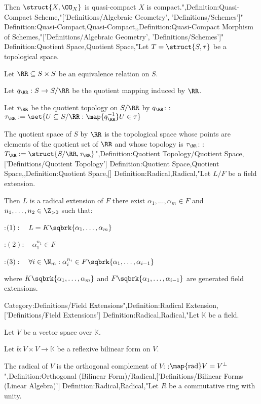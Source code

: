 Then $\struct {X, \OO_X}$ is quasi-compact  $X$ is compact.",Definition:Quasi-Compact Scheme,"['Definitions/Algebraic Geometry', 'Definitions/Schemes']"
Definition:Quasi-Compact,Quasi-Compact,,Definition:Quasi-Compact Morphism of Schemes,"['Definitions/Algebraic Geometry', 'Definitions/Schemes']"
Definition:Quotient Space,Quotient Space,"Let $T = \struct {S, \tau}$ be a topological space.

Let $\RR \subseteq S \times S$ be an equivalence relation on $S$.

Let $q_\RR: S \to S / \RR$ be the quotient mapping induced by $\RR$.


Let $\tau_\RR$ be the quotient topology on $S / \RR$ by $q_\RR$:
:$\tau_\RR := \set {U \subseteq S / \RR: \map {q_\RR^{-1} } U \in \tau}$


The quotient space of $S$ by $\RR$ is the topological space whose points are elements of the quotient set of $\RR$ and whose topology is $\tau_\RR$:
:$T_\RR := \struct {S / \RR, \tau_\RR}$",Definition:Quotient Topology/Quotient Space,['Definitions/Quotient Topology']
Definition:Quotient Space,Quotient Space,,Definition:Quotient Space,[]
Definition:Radical,Radical,"Let $L / F$ be a field extension.

Then $L$ is a radical extension of $F$  there exist $\alpha_1, \ldots, \alpha_m \in F$ and $n_1, \ldots, n_2 \in \Z_{>0}$ such that:

:$(1): \quad L = K \sqbrk {\alpha_1, \ldots, \alpha_m}$

:$(2): \quad \alpha_1^{n_1} \in F$

:$(3): \quad \forall i \in \N_m: \alpha_i^{n_i} \in F \sqbrk {\alpha_1, \ldots, \alpha_{i-1} }$

where $K \sqbrk {\alpha_1, \ldots, \alpha_m}$ and $F \sqbrk {\alpha_1, \ldots, \alpha_{i-1} }$ are generated field extensions.

Category:Definitions/Field Extensions",Definition:Radical Extension,['Definitions/Field Extensions']
Definition:Radical,Radical,"Let $\mathbb K$ be a field.

Let $V$ be a vector space over $\mathbb K$.

Let $b : V\times V \to \mathbb K$ be a reflexive bilinear form on $V$.


The radical of $V$ is the orthogonal complement of $V$:
:$\map {\operatorname {rad} } V = V^\perp$",Definition:Orthogonal (Bilinear Form)/Radical,['Definitions/Bilinear Forms (Linear Algebra)']
Definition:Radical,Radical,"Let $R$ be a commutative ring with unity.

